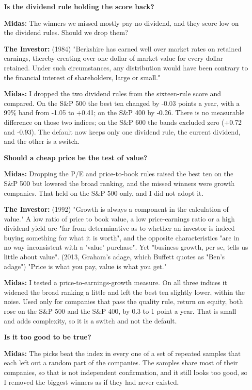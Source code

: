\documentclass[11pt,a4paper]{article}
\begin{document}
\textbf{Is the dividend rule holding the score back?}

\textbf{Midas:} The winners we missed mostly pay no dividend, and they score low on the dividend rules. Should we drop them?

\textbf{The Investor:} (1984) "Berkshire has earned well over market rates on retained earnings, thereby creating over one dollar of market value for every dollar retained. Under such circumstances, any distribution would have been contrary to the financial interest of shareholders, large or small."

\textbf{Midas:} I dropped the two dividend rules from the sixteen-rule score and compared. On the S\&P 500 the best ten changed by -0.03 points a year, with a 99\% band from -1.05 to +0.41; on the S\&P 400 by -0.26. There is no measurable difference on those two indices; on the S\&P 600 the bands excluded zero (+0.72 and -0.93). The default now keeps only one dividend rule, the current dividend, and the other is a switch.

\textbf{Should a cheap price be the test of value?}

\textbf{Midas:} Dropping the P/E and price-to-book rules raised the best ten on the S\&P 500 but lowered the broad ranking, and the missed winners were growth companies. That held on the S\&P 500 only, and I did not adopt it.

\textbf{The Investor:} (1992) "Growth is always a component in the calculation of value." A low ratio of price to book value, a low price-earnings ratio or a high dividend yield are "far from determinative as to whether an investor is indeed buying something for what it is worth", and the opposite characteristics "are in no way inconsistent with a 'value' purchase". Yet "business growth, per se, tells us little about value". (2013, Graham's adage, which Buffett quotes as "Ben's adage") "Price is what you pay, value is what you get."

\textbf{Midas:} I tested a price-to-earnings-growth measure. On all three indices it widened the broad ranking a little and left the best ten slightly lower, within the noise. Used only for companies that pass the quality rule, return on equity, both rose on the S\&P 500 and the S\&P 400, by 0.3 to 1 point a year. That is small and adds complexity, so it is a switch and not the default.

\textbf{Is it too good to be true?}

\textbf{Midas:} The picks beat the index in every one of a set of repeated samples that each left out a random part of the companies. The samples share most of their companies, so that is not independent confirmation, and it still looks too good, so I removed the biggest winners as if they had never existed.
\end{document}
